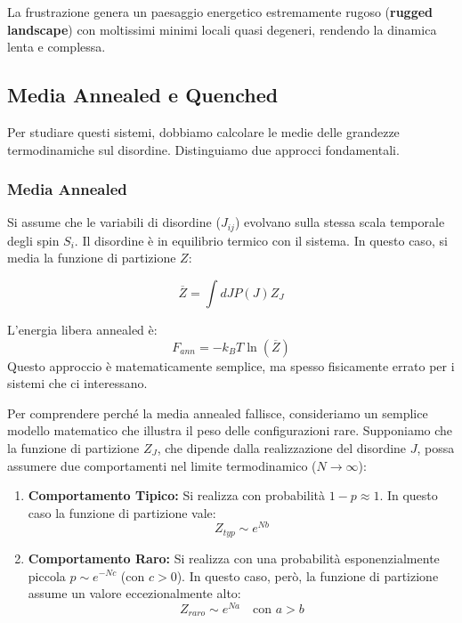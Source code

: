 La frustrazione genera un paesaggio energetico estremamente rugoso (\textbf{rugged landscape}) con moltissimi minimi locali quasi degeneri, rendendo la dinamica lenta e complessa.

\subsection{Media Annealed e Quenched}

Per studiare questi sistemi, dobbiamo calcolare le medie delle grandezze termodinamiche sul disordine. Distinguiamo due approcci fondamentali.

\subsubsection{Media Annealed}
Si assume che le variabili di disordine ($J_{ij}$) evolvano sulla stessa scala temporale degli spin $S_i$. Il disordine è in equilibrio termico con il sistema.
In questo caso, si media la funzione di partizione $Z$:

\begin{equation}
    \overline{Z} = \int dJ P(J) Z_J
\end{equation}

L'energia libera annealed è:
\begin{equation}
    F_{ann} = -k_B T \ln(\overline{Z})
\end{equation}
Questo approccio è matematicamente semplice, ma spesso fisicamente errato per i sistemi che ci interessano.

Per comprendere perché la media annealed fallisce, consideriamo un semplice modello matematico che illustra il peso delle configurazioni rare.
Supponiamo che la funzione di partizione $Z_J$, che dipende dalla realizzazione del disordine $J$, possa assumere due comportamenti nel limite termodinamico ($N \to \infty$):

\begin{enumerate}
    \item \textbf{Comportamento Tipico:} Si realizza con probabilità $1 - p \approx 1$. In questo caso la funzione di partizione vale:
    \begin{equation}
        Z_{typ} \sim e^{Nb}
    \end{equation}
    
    \item \textbf{Comportamento Raro:} Si realizza con una probabilità esponenzialmente piccola $p \sim e^{-Nc}$ (con $c > 0$). In questo caso, però, la funzione di partizione assume un valore eccezionalmente alto:
    \begin{equation}
        Z_{raro} \sim e^{Na} \quad \text{con } a > b
    \end{equation}
\end{enumerate}

